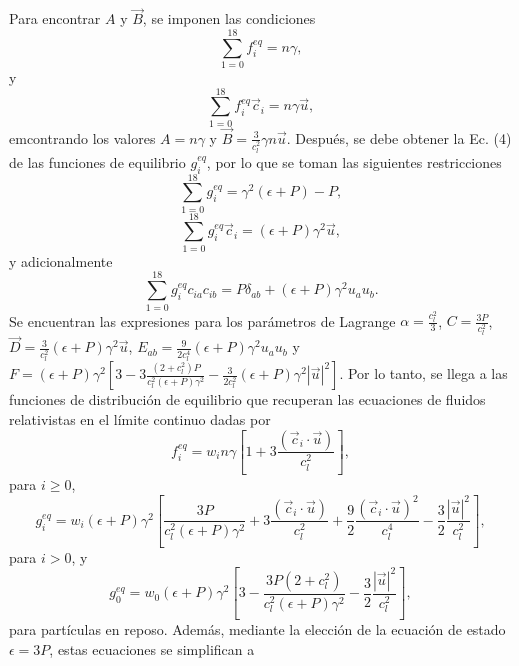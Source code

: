 \documentclass{article}
\begin{document}
 Para encontrar $A$ y $\vec{B}$, se imponen las condiciones 
 \begin{equation}
     \sum_{1=0}^{18} f_i^{eq} = n\gamma,
 \end{equation}
 y
 \begin{equation}
     \sum_{1=0}^{18} f_i^{eq} \vec{c}_i = n\gamma\vec{u},
 \end{equation}
 emcontrando los valores $A=n\gamma$ y $\vec{B}= \frac{
 3}{c_l^2}\gamma n \vec{u}$. Después, se debe obtener la Ec. (4) de las funciones de equilibrio $g_i^{eq}$, por lo que se toman las siguientes restricciones
 \begin{equation}
     \sum_{1=0}^{18} g_i^{eq} = \gamma^2 (\epsilon +P) -P,
 \end{equation}
 \begin{equation}
     \sum_{1=0}^{18} g_i^{eq} \vec{c}_i = (\epsilon+P)\gamma^2\vec{u},
 \end{equation}
 y adicionalmente
 \begin{equation}
     \sum_{1=0}^{18} g_i^{eq} c_{ia}c_{ib} = P \delta_{ab} +(\epsilon+P) \gamma^2 u_a u_b.
 \end{equation}
 Se encuentran las expresiones para los parámetros de Lagrange $\alpha= \frac{c_l^2}{3}$, $C=\frac{3P}{c_l^2}$, $\vec{D}= \frac{3}{c_l^2}(\epsilon+P) \gamma^2 \vec{u}$, $E_{ab}=\frac{9}{2c_l^4}(\epsilon+P) \gamma^2 u_a u_b$ y $F= (\epsilon+P) \gamma^2\left[ 3- 3\frac{(2+c_l^2)P}{c_l^2(\epsilon+P)\gamma^2}- \frac{3}{2c_l^2} (\epsilon+P)\gamma^2|\vec{u}|^2 \right].$ Por lo tanto, se llega a las funciones de distribución de equilibrio que recuperan las ecuaciones de fluidos relativistas en el límite continuo dadas por
  \begin{equation}
     f_i^{eq} = w_i n\gamma\left[ 1+3 \frac{(\vec{c}_i\cdot \vec{u})}{c_l^2} \right], 
 \end{equation}
 para $i\geq 0$, 
 \begin{equation}
     g_i^{eq} = w_i(\epsilon+P)\gamma^2\left[ \frac{3P}{c_l^2(\epsilon+P)\gamma^2}+3 \frac{(\vec{c}_i\cdot \vec{u})}{c_l^2}+ \frac{9}{2} \frac{(\vec{c}_i\cdot \vec{u})^2}{c_l^4}-\frac{3}{2}\frac{|\vec{u}|^2}{c_l^2} \right], 
 \end{equation}
  para $i> 0$, y
   \begin{equation}
     g_0^{eq} = w_0(\epsilon+P)\gamma^2\left[3- \frac{3P(2+c_l^2)}{c_l^2(\epsilon+P)\gamma^2}-\frac{3}{2}\frac{|\vec{u}|^2}{c_l^2} \right], 
 \end{equation}
 para partículas en reposo. Además, mediante la elección de la ecuación de estado $\epsilon=3P$, estas ecuaciones se simplifican a 
\end{document}
